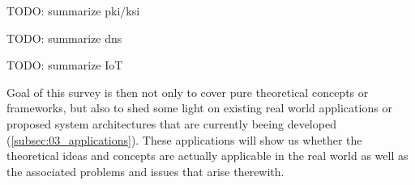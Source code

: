 TODO: summarize pki/ksi

TODO: summarize dns

TODO: summarize IoT

Goal of this survey is then not only to cover pure theoretical concepts or frameworks, but also to shed some light on existing real world applications or proposed system architectures that are currently beeing developed (\ref{subsec:03_applications}). These applications will show us whether the theoretical ideas and concepts are actually applicable in the real world as well as the associated problems and issues that arise therewith.
